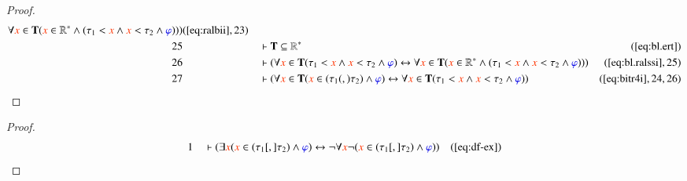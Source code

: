 \begin{proof}
\begin{align}
      \forall \msc{x} \in \mathbf{T} ( \msc{x} \in
      \mathbb{R}^{\ast} \wedge ( \tau_1 < \msc{x} \wedge
      \msc{x} < \tau_2 \wedge \mw{\varphi} ) )
      )&(\mbox{\ref{eq:ralbii}},23)\notag
  \\ 25 &&  & \vdash \mathbf{T} \subseteq
      \mathbb{R}^{\ast}&(\mbox{\ref{eq:bl.ert}})\notag
  \\ 26 &&  & \vdash ( \forall \msc{x} \in \mathbf{T} ( \tau_1 < \msc{x} \wedge
      \msc{x} < \tau_2 \wedge \mw{\varphi} )
      \leftrightarrow \forall \msc{x} \in \mathbf{T} (
      \msc{x} \in \mathbb{R}^{\ast} \wedge ( \tau_1 < \msc{x}
      \wedge \msc{x} < \tau_2 \wedge \mw{\varphi} ) )
      )&(\mbox{\ref{eq:bl.ralssi}},25)\notag
  \\ 27 &&  & \vdash ( \forall \msc{x} \in \mathbf{T} ( \msc{x} \in ( \tau_1
      (,) \tau_2 ) \wedge \mw{\varphi} ) \leftrightarrow
      \forall \msc{x} \in \mathbf{T} ( \tau_1 < \msc{x}
      \wedge \msc{x} < \tau_2 \wedge \mw{\varphi} )
      )&(\mbox{\ref{eq:bitr4i}},24,26)\notag
\end{align}
\end{proof}

\blexdd

\begin{proof}\label{proof:bl.exdd}
\begin{align}
  1 &&  & \vdash ( \exists \msc{x} ( \msc{x} \in ( \tau_1 [,] \tau_2 ) \wedge
      \mw{\varphi} ) \leftrightarrow \lnot \forall \msc{x}
      \lnot ( \msc{x} \in ( \tau_1 [,] \tau_2 ) \wedge
      \mw{\varphi} ) )&(\mbox{\ref{eq:df-ex}})\notag
\end{align}
\end{proof}

\blexcc

